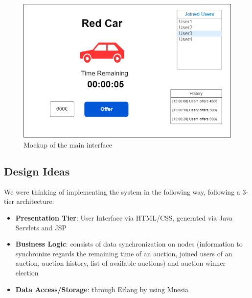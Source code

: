 \begin{figure}[H]
	\centering
	\includegraphics[width=0.7\linewidth]{img/wireframeDSMT.drawio}
	\caption{Mockup of the main interface}
	\label{fig:wireframedsmt}
\end{figure}

\subsection{Design Ideas}
We were thinking of implementing the system in the following way, following a 3-tier architecture:
\begin{itemize}
	\item \textbf{Presentation Tier}: User Interface via HTML/CSS, generated via Java Servlets and JSP
	\item \textbf{Business Logic}: consists of data synchronization on nodes (information to synchronize regards the remaining time of an auction, joined users of an auction, auction history, list of available auctions) and auction winner election
	\item \textbf{Data Access/Storage}: through Erlang by using Mnesia
\end{itemize}